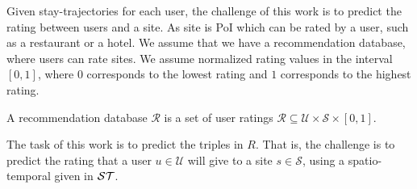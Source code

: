 Given stay-trajectories for each user, the challenge of this work is to predict the rating between users and a site. As site is PoI which can be rated by a user, such as a restaurant or a hotel. We assume that we have a recommendation database, where users can rate sites. We assume normalized rating values in the interval $[0,1]$, where $0$ corresponds to the lowest rating and $1$ corresponds to the highest rating.
\begin{definition}
A recommendation database $\mathcal{R}$ is a set of user ratings $\mathcal{R}\subseteq \mathcal{U}\times\mathcal{S}\times [0,1]$.
\end{definition}
The task of this work is to predict the triples in $R$. That is, the challenge is to predict the rating that a user $u\in \mathcal{U}$ will give to a site $s\in\mathcal{S}$, using a spatio-temporal given in $\mathcal{ST}$.

